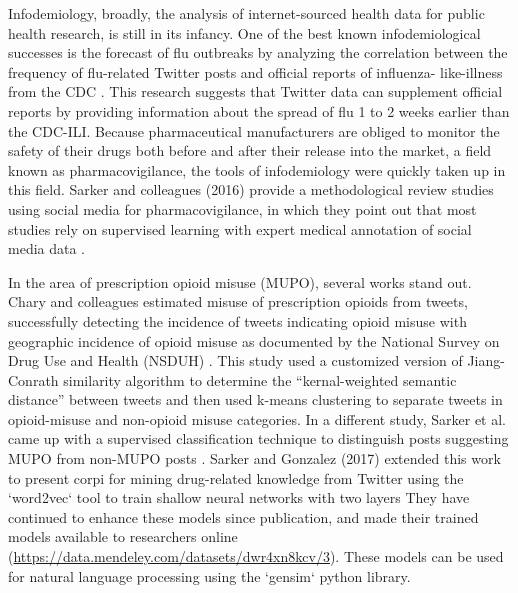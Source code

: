 \documentclass[sigconf]{acmart}
\begin{document}
Infodemiology, broadly, the analysis of internet-sourced health data for public 
health research, is still in its infancy. One of the best known infodemiological 
successes is the forecast of flu outbreaks by analyzing the correlation between 
the frequency of flu-related Twitter posts and official reports of influenza-
like-illness from the CDC \cite{culotta10, paul14}. This research suggests that 
Twitter data can supplement official reports by providing information about the 
spread of flu 1 to 2 weeks earlier than the CDC-ILI. Because pharmaceutical 
manufacturers are obliged to monitor the safety of their drugs both before and 
after their release into the market, a field known as pharmacovigilance, the 
tools of infodemiology were quickly taken up in this field. Sarker and 
colleagues (2016) provide a methodological review studies using social media 
for pharmacovigilance, in which they point out that most studies rely on 
supervised learning with expert medical annotation of social media data 
\cite{sarker16}. 

In the area of prescription opioid misuse (MUPO), several works stand out. 
Chary and colleagues estimated misuse of prescription opioids from tweets, 
successfully detecting the incidence of tweets indicating opioid misuse with 
geographic incidence of opioid misuse as documented by the National Survey 
on Drug Use and Health (NSDUH) \cite{chary17}. This study used a customized 
version of Jiang-Conrath similarity algorithm \cite{jiang97} to determine the 
``kernal-weighted semantic distance'' between tweets and then used k-means 
clustering to separate tweets in opioid-misuse and non-opioid misuse 
categories. In a different study, Sarker et al. came up with a supervised 
classification technique to distinguish posts suggesting MUPO from non-MUPO 
posts \cite{sarker15}. Sarker and Gonzalez (2017) extended this work to present 
corpi for mining drug-related knowledge from Twitter using the `word2vec` tool 
to train shallow neural networks with two layers \cite{sarker17} They have 
continued to enhance these models since publication, and made their trained 
models available to researchers online 
(\url{https://data.mendeley.com/datasets/dwr4xn8kcv/3}). 
These models can be used for natural language processing using the `gensim` 
python library.

\end{document}
